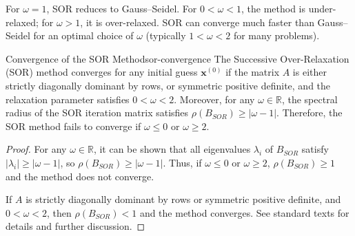 For \(\omega = 1\), SOR reduces to Gauss--Seidel. For \(0 < \omega < 1\), the method is under-relaxed; for \(\omega > 1\), it is over-relaxed. SOR can converge much faster than Gauss--Seidel for an optimal choice of \(\omega\) (typically \(1 < \omega < 2\) for many problems).

\begin{theorem}{Convergence of the SOR Method}{sor-convergence}
    The Successive Over-Relaxation (SOR) method converges for any initial guess \(\mathbf{x}^{(0)}\) if the matrix \(A\) is either strictly diagonally dominant by rows, or symmetric positive definite, and the relaxation parameter satisfies \(0 < \omega < 2\).
    Moreover, for any \(\omega \in \mathbb{R}\), the spectral radius of the SOR iteration matrix satisfies \(\rho(B_{SOR}) \geq |\omega - 1|\). Therefore, the SOR method fails to converge if \(\omega \leq 0\) or \(\omega \geq 2\).
\end{theorem}
\begin{proof}
    For any \(\omega \in \mathbb{R}\), it can be shown that all eigenvalues \(\lambda_i\) of \(B_{SOR}\) satisfy \(|\lambda_i| \geq |\omega - 1|\), so \(\rho(B_{SOR}) \geq |\omega - 1|\). Thus, if \(\omega \leq 0\) or \(\omega \geq 2\), \(\rho(B_{SOR}) \geq 1\) and the method does not converge.

    If \(A\) is strictly diagonally dominant by rows or symmetric positive definite, and \(0 < \omega < 2\), then \(\rho(B_{SOR}) < 1\) and the method converges. See standard texts for details and further discussion.
\end{proof}
